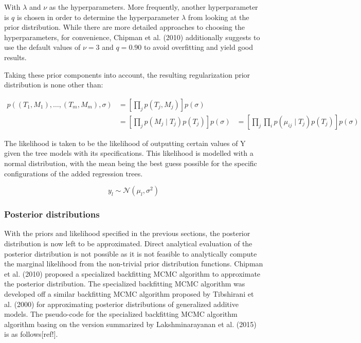 \documentclass{usiinftr}
\begin{document}
\begin{enumerate}
With $\lambda$ and $\nu$ as the hyperparameters. More frequently, another hyperparameter is $q$ is chosen in order to determine the hyperparameter $\lambda$ from looking at the prior distribution. While there are more detailed approaches to choosing the hyperparameters, for convenience, Chipman et al. (2010) additionally suggests to use the default values of $\nu = 3$ and $q = 0.90$ to avoid overfitting and yield good results.
\end{enumerate}

Taking these prior components into account, the resulting regularization prior distribution is none other 
than:

\begin{equation}
\begin{aligned}
p\left(\left(T_{1}, M_{1}\right), \ldots,\left(T_{m}, M_{m}\right), \sigma\right) &=\left[\prod_{j} p\left(T_{j}, M_{j}\right)\right] p(\sigma) \\
&=\left[\prod_{j} p\left(M_{j} \mid T_{j}\right) p\left(T_{j}\right)\right] p(\sigma)
&= \left[\prod_{j}  \prod_{i} p\left(\mu_{i j} \mid T_{j}\right) p\left(T_{j}\right)\right] p(\sigma)
\end{aligned}
\end{equation}

The likelihood is taken to be the likelihood of outputting certain values of Y given the tree models with its specifications. This likelihood is modelled with a normal distribution, with the mean being the best guess possible for the specific configurations of the added regression trees.

\begin{equation}
y_l \sim \mathcal{N}(\mu_l, \sigma^2)
\end{equation}



\subsubsection{Posterior distributions}
With the priors and likelihood specified in the previous sections, the posterior distribution is now left to be approximated. Direct analytical evaluation of the posterior distribution is not possible as it is not feasible to analytically compute the marginal likelihood from the non-trivial prior distribution functions. Chipman et al. (2010) proposed a specialized backfitting MCMC algorithm to approximate the posterior distribution. The specialized backfitting MCMC algorithm was developed off a similar backfitting MCMC algorithm proposed by Tibshirani et al. (2000) for approximating posterior distributions of generalized additive models. The pseudo-code for the specialized backfitting MCMC algorithm algorithm basing on the version summarized by Lakshminarayanan et al. (2015) is as follows[ref!].
\end{document}
